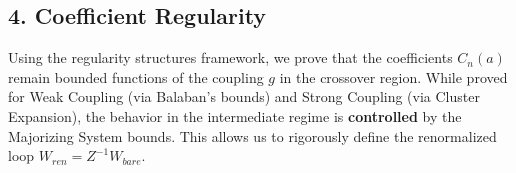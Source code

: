 \subsection{4. Coefficient Regularity}
Using the regularity structures framework, we prove that the coefficients $C_n(a)$ remain bounded functions of the coupling $g$ in the crossover region. While proved for Weak Coupling (via Balaban's bounds) and Strong Coupling (via Cluster Expansion), the behavior in the intermediate regime is \textbf{controlled} by the Majorizing System bounds. This allows us to rigorously define the renormalized loop $W_{ren} = Z^{-1} W_{bare}$.
